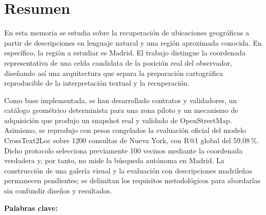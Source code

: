 \chapter*{Resumen}
\begin{center}
  \textbf{\tituloTFG}\par\medskip
  \textbf{\tituloTFGEnglish}
\end{center}
En esta memoria se estudia sobre la recuperación de ubicaciones geográficas a partir de descripciones en lenguaje natural y una región aproximada conocida. En específico, la región a estudiar es Madrid. El trabajo distingue la coordenada representativa de una celda candidata de la posición real del observador, diseñando así una arquitectura que separa la preparación cartográfica reproducible de la interpretación textual y la recuperación.

Como base implementada, se han desarrollado contratos y validadores, un catálogo geométrico determinista para una zona piloto y un mecanismo de adquisición que produjo un snapshot real y validado de OpenStreetMap. Asimismo, se reprodujo con pesos congelados la evaluación oficial del modelo CrossText2Loc sobre 1200 consultas de Nueva York, con R@1 global del 59,08\,\%. Dicho protocolo selecciona previamente 100 vecinos mediante la coordenada verdadera y, por tanto, no mide la búsqueda autónoma en Madrid. La construcción de una galería visual y la evaluación con descripciones madrileñas permanecen pendientes; se delimitan los requisitos metodológicos para abordarlas sin confundir diseños y resultados.

\noindent\textbf{Palabras clave:} \palabrasClaveTFG

